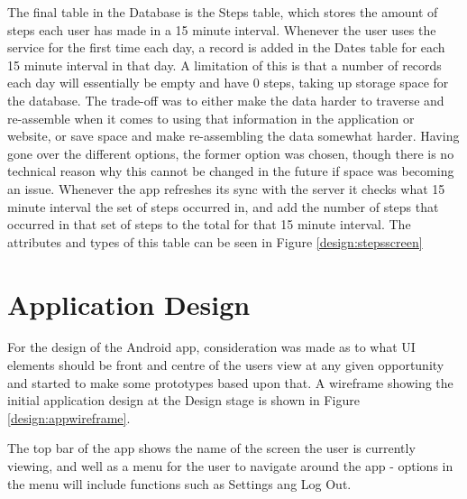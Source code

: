 \documentclass{l4proj}
\begin{document}
The final table in the Database is the Steps table, which stores the amount of steps each user has made in a 15 minute interval. Whenever the user uses the service for the first time each day, a record is added in the Dates table for each 15 minute interval in that day. A limitation of this is that a number of records each day will essentially be empty and have 0 steps, taking up storage space for the database. The trade-off was to either make the data harder to traverse and re-assemble when it comes to using that information in the application or website, or save space and make re-assembling the data somewhat harder. Having gone over the different options, the former option was chosen, though there is no technical reason why this cannot be changed in the future if space was becoming an issue. Whenever the app refreshes its sync with the server it checks what 15 minute interval the set of steps occurred in, and add the number of steps that occurred in that set of steps to the total for that 15 minute interval. The attributes and types of this table can be seen in Figure \ref{design:stepsscreen}

\section{Application Design}

For the design of the Android app, consideration was made as to what UI elements should be front and centre of the users view at any given opportunity and started to make some prototypes based upon that. A wireframe showing the initial application design at the Design stage is shown in Figure \ref{design:appwireframe}.

The top bar of the app shows the name of the screen the user is currently viewing, and well as a menu for the user to navigate around the app - options in the menu will include functions such as Settings ang Log Out.
\end{document}
